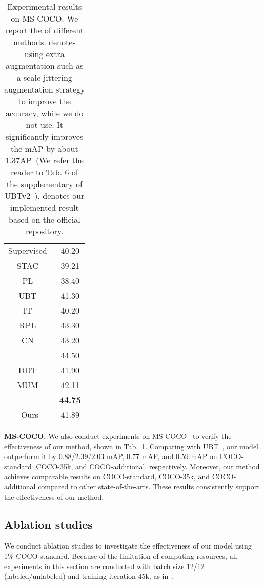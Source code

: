 \documentclass{bmvc2k}
\begin{document}
\begin{table}[h]
\begin{tabular}{c|c}
        \midrule
        Supervised~\cite{liu2021unbiased} & 40.20 \\
        STAC~\cite{STAC}& 39.21 \\
        PL~\cite{proposal_learning} & 38.40 \\
        UBT~\cite{liu2021unbiased}  & 41.30 \\
        IT~\cite{instant_teaching} & 40.20 \\
        RPL~\cite{rethink} & 43.30 \\ 
        CN~\cite{combatnoise} & 43.20 \\
        ~\cite{xu2021soft} & 44.50 \\
        DDT~\cite{zheng2022dual} & 41.90 \\
        MUM~\cite{MUM} & 42.11 \\
        ~\cite{ubteacherv2} & \textbf{44.75} \\
        \midrule
        Ours & 41.89 \\
        \bottomrule
    \end{tabular}
    \caption{Experimental results on MS-COCO. We report the  of different methods.  denotes using extra augmentation such as a scale-jittering augmentation strategy to improve the accuracy, while we do not use. It significantly improves the mAP by about 1.37AP~(We refer the reader to Tab. 6 of the supplementary of UBTv2~\cite{ubteacherv2}).
     denotes our implemented result based on the official repository.
    }
    \label{tab:coco}
\end{table}
\makeatletter
\newcommand\tabcaption{\def\@captype{table}\caption}
\newcommand\figcaption{\def\@captype{figure}\caption}
\makeatother

\noindent \textbf{MS-COCO.}
We also conduct experiments on MS-COCO~\cite{mscoco} to verify the effectiveness of our method, shown in Tab.~\ref{tab:coco}. Comparing with UBT~\cite{liu2021unbiased}, our model outperform it by 0.88/2.39/2.03 mAP, 0.77 mAP, and 0.59 mAP on COCO-standard
,COCO-35k, and COCO-additional. respectively. 
Moreover, our method achieves comparable results on COCO-standard, COCO-35k, and COCO-additional compared to other state-of-the-arts.
These results consistently support the effectiveness of our method. 


\subsection{Ablation studies}
We conduct ablation studies to investigate the effectiveness of our model using 1\% COCO-standard.
Because of the limitation of computing resources, all experiments in this section are conducted with batch size 12/12 (labeled/unlabeled) and training iteration 45k, as in~\cite{MUM}.
\end{document}
